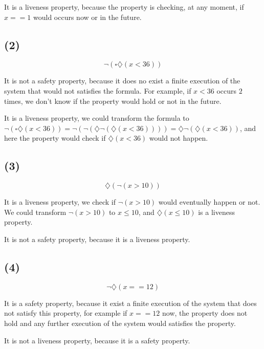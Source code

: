 \documentclass[a4paper,11pt]{report}
\newcommand*{\A}{\square}  %
\newcommand*{\D}{\diamondsuit} %
\begin{document}
It is a liveness property, because the property is checking, at any moment, if
$x==1$ would occurs now or in the future.

\subsection*{(2)}
\[
  \neg (\A \D (x < 36))
\]

It is not a safety property, because it does no exist a finite execution of the
system that would not satisfies the formula. For example, if $x < 36$ occurs $2$
times, we don't know if the property would hold or not in the future.

It is a liveness property, we could transform the formula to $\neg (\A \D (x <
36)) = \neg (\neg (\D \neg (\D (x < 36)))) = \D \neg (\D (x < 36))$, and here
the property would check if $\D (x < 36)$ would not happen.

\subsection*{(3)}
\[
  \D (\neg (x > 10))
\]

It is a liveness property, we check if $\neg(x > 10)$ would eventually happen or
not. We could transform $\neg(x > 10)$ to $x \leq 10$, and $\D (x \leq 10)$ is a
liveness property.

It is not a safety property, because it is a liveness property.

\subsection*{(4)}
\[
  \neg\D(x == 12)
\]

It is a safety property, because it exist a finite execution of the system that
does not satisfy this property, for example if $x==12$ now, the property does
not hold and any further execution of the system would satisfies the property.

It is not a liveness property, because it is a safety property.
\end{document}

